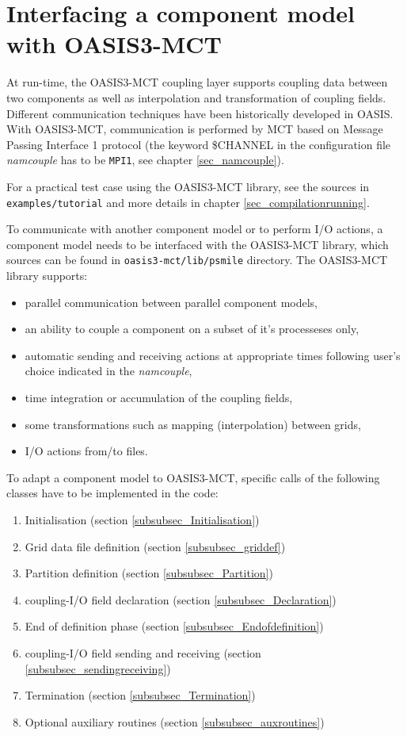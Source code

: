 \newpage
\chapter{Interfacing a component model with OASIS3-MCT}
\label{sec_modelinterfacing}

At run-time, the OASIS3-MCT coupling layer supports coupling data
between two components as well as interpolation and transformation
of coupling fields. Different communication techniques have been historically
developed in OASIS. With OASIS3-MCT, communication is performed by MCT based on Message Passing Interface 1 protocol (the keyword \$CHANNEL in the configuration file {\it namcouple} has to be {\tt MPI1}, see chapter \ref{sec_namcouple}). 

For a practical test case using the OASIS3-MCT library, see the sources in
{\tt examples/tutorial} and more details in chapter \ref{sec_compilationrunning}.

To communicate with another component model or to perform I/O actions, a component model needs to be interfaced with the OASIS3-MCT library, which sources can be found in {\tt oasis3-mct/lib/psmile} directory. The OASIS3-MCT library supports:

\begin{itemize}
\item parallel communication between parallel component models,
\item an ability to couple a component on a subset of it's processeses only,
\item automatic sending and receiving actions at appropriate times
 following user's choice indicated in the {\it namcouple},
\item time integration or accumulation of the coupling fields,
\item some transformations such as mapping (interpolation) between grids,
\item I/O actions from/to files.
\end{itemize}

To adapt a component model to OASIS3-MCT, specific calls of
 the following classes have to be implemented in the code:

\begin{enumerate}
\item Initialisation (section \ref{subsubsec_Initialisation})
\item Grid data file definition (section \ref{subsubsec_griddef})
\item Partition definition (section \ref{subsubsec_Partition})
\item coupling-I/O field declaration (section \ref{subsubsec_Declaration})
\item End of definition phase (section \ref{subsubsec_Endofdefinition})
\item coupling-I/O field sending and receiving (section
\ref{subsubsec_sendingreceiving})
\item Termination (section \ref{subsubsec_Termination})
\item Optional auxiliary routines (section \ref{subsubsec_auxroutines})
\end{enumerate}

